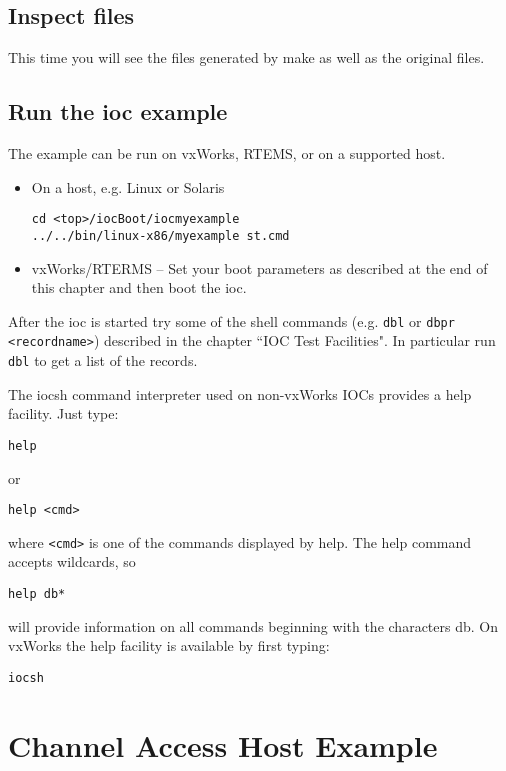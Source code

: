 \subsection{Inspect files}

This time you will see the files generated by make as well as the original files.

\subsection{Run the ioc example}

The example can be run on vxWorks, RTEMS, or on a supported host.

\begin{itemize}
\item On a host, e.g. Linux or Solaris

\begin{verbatim}
cd <top>/iocBoot/iocmyexample
../../bin/linux-x86/myexample st.cmd
\end{verbatim}

\item vxWorks/RTERMS -- Set your boot parameters as described at the end of this chapter and then boot the ioc.
\end{itemize}

After the ioc is started try some of the shell commands (e.g. \verb|dbl| or \verb|dbpr <recordname>|) described in the chapter ``IOC 
Test Facilities". In particular run \verb|dbl| to get a list of the records.

The iocsh command interpreter used on non-vxWorks IOCs provides a help facility. Just type:

\begin{verbatim}
help
\end{verbatim}
or
\begin{verbatim}
help <cmd>
\end{verbatim}
where \verb|<cmd>| is one of the commands displayed by help.  The help command accepts wildcards, so
\begin{verbatim}
help db*
\end{verbatim}
will provide information on all commands beginning with the characters db.
On vxWorks the help facility is available by first typing:

\begin{verbatim}
iocsh
\end{verbatim}

\section{Channel Access Host Example}

